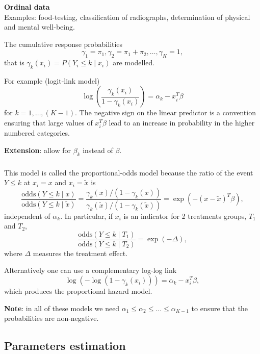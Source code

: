 \documentclass{beamer}
\newcommand{\bs}{\bigskip}
\newcommand{\sms}{\smallskip}
\begin{document}
\begin{frame}
\frametitle{}

\textbf{Ordinal data}\\
Examples: food-testing, classification of radiographs, determination of physical and
mental well-being. 

\sms
The cumulative response probabilities 
$$\gamma_1 = \pi_1, \gamma_2=\pi_1+\pi_2, \ldots, \gamma_K=1,$$
that is $\gamma_k(x_i) = P(Y_i \leq k \mid x_i)$ are modelled. 

\bs
For example (logit-link model)
$$\log\left(\frac{\gamma_k(x_i)}{1-\gamma_k(x_i)} \right) = \alpha_k - x_i^T \beta$$
for $k=1, \ldots, (K-1)$. The negative sign on the linear predictor is a
convention ensuring that large values of $x_i^T \beta$ lead to an increase in
probability in the higher numbered categories.

\bs
\textbf{Extension}: allow for $\beta_k$ instead of $\beta$.
\end{frame}


\begin{frame}
\frametitle{}

This model is called the
{\color{blue}proportional-odds} model because the ratio of the event $Y \leq k$
at $x_i=x$ and $x_i = \tilde{x}$ is
$$\frac{\mbox{odds}(Y\leq k\mid x)}{\mbox{odds}(Y\leq k\mid
\tilde{x})} = \frac{\gamma_k(x)/(1-\gamma_k(x))}{\gamma_k(\tilde{x}) / 
(1-\gamma_k(\tilde{x}))} = \exp(-(x-\tilde{x})^T \beta),$$
independent of $\alpha_k$. In particular, if $x_i$ is an indicator for 2
treatments groups, $T_1$ and 
$T_2$, 
$$\frac{\mbox{odds}(Y\leq k \mid T_1)}{\mbox{odds}(Y\leq k\mid
T_2)}= \exp(-\Delta),$$
where $\Delta$ measures the treatment effect.

\sms
Alternatively one can use a complementary log-log link
$$ \log\left(-\log(1-\gamma_k(x_i))\right)= \alpha_k - x_i^T \beta,$$
which produces the {\color{blue}proportional hazard} model.

\bs
\textbf{Note}: in all of these models we need $\alpha_1 \leq \alpha_2 \leq
\ldots \leq \alpha_{K-1}$  to ensure that the probabilities are non-negative.
\end{frame}

\subsection{Parameters estimation}
\label{GLM.estim.section}
\end{document}
